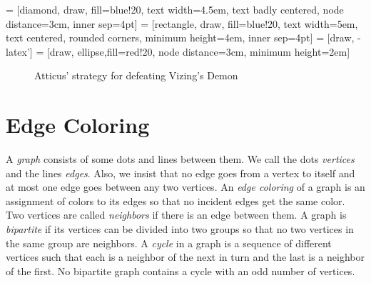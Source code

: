 \documentclass[12pt]{article}
\theoremstyle{plain}
\theoremstyle{definition}
\theoremstyle{remark}
\begin{document}
 = [diamond, draw, fill=blue!20, 
    text width=4.5em, text badly centered, node distance=3cm, inner sep=4pt]
 = [rectangle, draw, fill=blue!20, 
    text width=5em, text centered, rounded corners, minimum height=4em, inner sep=4pt]
 = [draw, -latex']
 = [draw, ellipse,fill=red!20, node distance=3cm,
    minimum height=2em]
    
\begin{figure}
\begin{center}
\end{center}
\caption{Atticus' strategy for defeating Vizing's Demon}
\label{fig:VizingFlow}
\end{figure}

\section{Edge Coloring}\label{graphcolor}
A \emph{graph} consists of some dots and lines between them.  We call the dots \emph{vertices} and the lines \emph{edges}.  Also, we insist that no edge goes from a vertex to itself and at most one edge goes between any two vertices.  An \emph{edge coloring} of a graph is an assignment of colors to its edges so that no incident edges get the same color.  Two vertices are called \emph{neighbors} if there is an edge between them.  A graph is \emph{bipartite} if its vertices can be divided into two groups so that no two vertices in the same group are neighbors.  A \emph{cycle} in a graph is a sequence of different vertices such that each is a neighbor of the next in turn and the last is a neighbor of the first.  No bipartite graph contains a cycle with an odd number of vertices.
\end{document}
